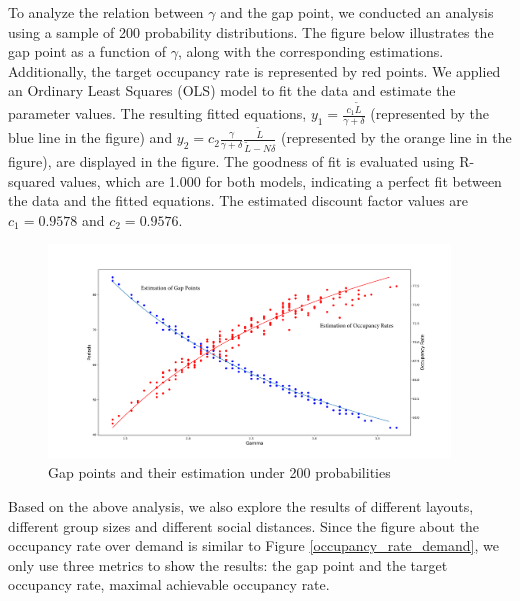 To analyze the relation between $\gamma$ and the gap point, we conducted an analysis using a sample of 200 probability distributions. The figure below illustrates the gap point as a function of $\gamma$, along with the corresponding estimations.  Additionally, the target occupancy rate is represented by red points. 
We applied an Ordinary Least Squares (OLS) model to fit the data and estimate the parameter values. The resulting fitted equations, $y_1 = \frac{c_1 \tilde{L}}{\gamma + \delta}$ (represented by the blue line in the figure) and $y_2 = c_2 \frac{\gamma}{\gamma + \delta} \frac{\tilde{L}}{\tilde{L}-N \delta}$ (represented by the orange line in the figure), are displayed in the figure. The goodness of fit is evaluated using R-squared values, which are 1.000 for both models, indicating a perfect fit between the data and the fitted equations. The estimated discount factor values are $c_1 = 0.9578$ and $c_2 = 0.9576$.

\begin{figure}[ht]
  \centering
    \includegraphics[width=0.95\textwidth]{./Figures/gamma_estimation.pdf}
  \caption{Gap points and their estimation under 200 probabilities}
\end{figure}


Based on the above analysis, we also explore the results of different layouts, different group sizes and different social distances. Since the figure about the occupancy rate over demand is similar to Figure \ref{occupancy_rate_demand}, we only use three metrics to show the results: the gap point and the target occupancy rate, maximal achievable occupancy rate.

